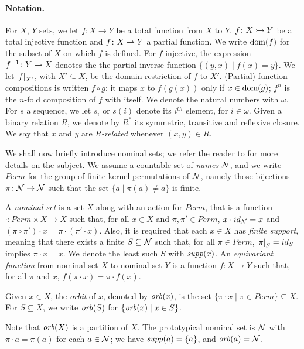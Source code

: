 \paragraph{Notation.} For $X$, $Y$ sets, we let $f \colon X \to Y$ be a total function from $X$ to $Y$, $f \colon X \rightarrowtail Y$ be a total injective function and $f \colon X \rightharpoonup Y$ a partial function. We write $\operatorname{dom}(f)$ for the subset of $X$ on which $f$ is defined. For $f$ injective, the expression $f^{-1} \colon Y \rightharpoonup X$ denotes the the partial inverse function $\{(y,x) \mid f(x) = y \}$. We let $\left.f\right|_{X'}$, with $X' \subseteq X$, be the domain restriction of $f$ to $X'$. (Partial) function compositions is written $f \circ g$: it maps $x$ to $f(g(x))$ only if $x \in \operatorname{dom}(g)$; $f^n$ is the $n$-fold composition of $f$ with itself. We denote the natural numbers with $\omega$. For $s$ a sequence, we let $s_i$ or $s(i)$ denote its $i^{\mathit{th}}$ element, for $i \in \omega$. Given a binary relation $R$, we denote by $R^*$ its symmetric, transitive and reflexive closure. We say that $x$ and $y$ are \emph{$R$-related} whenever $(x,y) \in R$.

We shall now briefly introduce nominal sets; we refer the reader to \cite{GabbayPitts?} for more details on the subject. We assume a countable set of \emph{names} $\mathcal{N}$, and we write $Perm$ for the group of finite-kernel permutations of $\mathcal{N}$, namely those bijections $\pi \colon \mathcal{N} \to \mathcal{N}$ such that the set $\{ a \mid \pi(a) \neq a \}$ is finite.
\begin{definition}
A \emph{nominal set} is a set $X$ along with an action for $Perm$, that is a function $\cdot \colon Perm \times X \to X$ such that, for all $x \in X$ and $\pi,\pi' \in Perm$, $x \cdot id_{\mathcal{N}} = x$ and $(\pi \circ \pi') \cdot x = \pi \cdot (\pi' \cdot x)$. Also, it is required that each $x \in X$ has \emph{finite support}, meaning that there exists a finite $S \subseteq \mathcal{N}$ such that, for all $\pi \in Perm$, $\left.\pi\right|_{S} = id_S$ implies $\pi \cdot x = x$. We denote the least such $S$ with $\mathit{supp}(x)$. An \emph{equivariant function} from nominal set $X$ to nominal set $Y$ is a function $f : X \to Y$ such that, for all $\pi$ and $x$, $f(\pi \cdot x) = \pi \cdot f(x)$.
\end{definition}
%
\begin{definition}
Given $x \in X$, the \emph{orbit} of $x$, denoted by $\mathit{orb}(x) $, is the set $\{ \pi \cdot x \mid \pi \in Perm\} \subseteq X$. For $S \subseteq X$, we write $\mathit{orb}(S)$ for $\{ \mathit{orb}(x) \mid x \in S\}$. 
\end{definition}

\noindent Note that $\mathit{orb}(X)$ is a partition of $X$. The prototypical nominal set is $\mathcal{N}$ with $\pi \cdot a = \pi(a)$ for each $a \in \mathcal{N}$; we have $\mathit{supp}(a) = \{a\}$, and $\mathit{orb}(a) = \mathcal{N}$.
